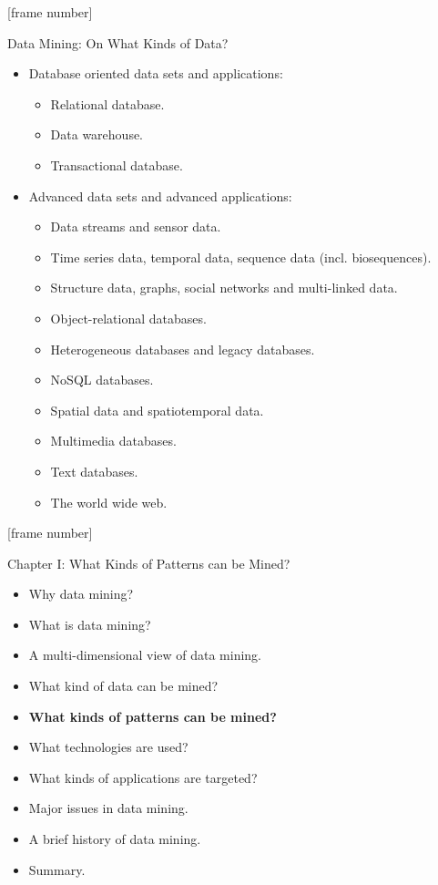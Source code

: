 \documentclass[aspectratio=169,t]{beamer}
\begin{document}
  {
    [frame number]
    \begin{frame}{Data Mining: On What Kinds of Data?}
        \begin{itemize}
            \item Database oriented data sets and applications:
            \begin{itemize}
                \item Relational database.
                \item Data warehouse.
                \item Transactional database.
            \end{itemize}
            \item Advanced data sets and advanced applications:
            \begin{itemize}
                \item Data streams and sensor data.
                \item Time series data, temporal data, sequence data (incl. biosequences).
                \item Structure data, graphs, social networks and multi-linked data.
                \item Object-relational databases.
                \item Heterogeneous databases and legacy databases.
                \item NoSQL databases.
                \item Spatial data and spatiotemporal data.
                \item Multimedia databases.
                \item Text databases.
                \item The world wide web.
            \end{itemize}
        \end{itemize}
    \end{frame}
  }

  {
    [frame number]
    \begin{frame}{Chapter I: What Kinds of Patterns can be Mined?}
        \begin{itemize}
            \item Why data mining?
            \item What is data mining?
            \item A multi-dimensional view of data mining.
            \item What kind of data can be mined?
            \item \textbf{What kinds of patterns can be mined?}
            \item What technologies are used?
            \item What kinds of applications are targeted?
            \item Major issues in data mining.
            \item A brief history of data mining.
            \item Summary.
        \end{itemize}
    \end{frame}
  }
\end{document}

